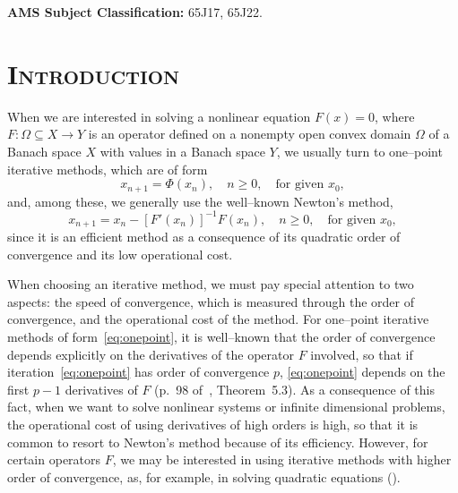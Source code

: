 \documentclass[11pt,twoside,letterpaper]{article} %
\begin{document}
\vspace{.08in}

\noindent\textbf{AMS Subject Classification:} 65J17, 65J22.

\section{\scshape Introduction}

When we are interested in solving a nonlinear equation $F(x)=0$, where $F:\Omega\subseteq X\to Y$ is an operator defined on a nonempty open convex domain $\Omega$ of a Banach space $X$ with values in a Banach space $Y$, we usually turn to one--point iterative methods, which are of form
\begin{equation}
\label{eq:onepoint}
x_{n+1}=\Phi(x_n),\quad n\geq 0,
\quad\mbox{for given } x_0,
\end{equation}
and, among these, we generally use the well--known Newton's method,
\begin{equation}
\label{eq:newton}
x_{n+1}=x_n-[F'(x_n)]^{-1}F(x_n),\quad n\geq 0,
\quad\mbox{for given } x_0,
\end{equation}
since it is an efficient method as a consequence of its quadratic order of convergence and its low operational cost.

When choosing an iterative method, we must pay special attention to two aspects: the speed of convergence, which is measured through the order of convergence, and the operational cost of the method. For one--point iterative methods of form~\eqref{eq:onepoint}, it is well--known that the order of convergence depends explicitly on the derivatives of the operator $F$ involved, so that if iteration~\eqref{eq:onepoint} has order of convergence $p$,  \eqref{eq:onepoint} depends on the first $p-1$ derivatives of $F$ (p.~98 of~\cite{Tra}, Theorem~5.3). As a consequence of this fact, when we want to solve nonlinear systems or infinite dimensional problems, the operational cost of using derivatives of high orders is high, so that it is common to resort to Newton's method because of its efficiency. However, for certain operators $F$, we may be interested in using iterative methods with higher order of convergence, as, for example, in solving quadratic equations (\cite{LT1,LT2}).

\pagestyle{fancy}
\fancyhead{}
\fancyhead[EL,OR]{\thepage}
\fancyfoot{}
\renewcommand\headrulewidth{0.pt} 
\end{document}
